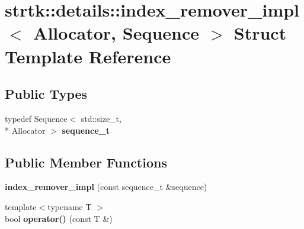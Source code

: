 \hypertarget{structstrtk_1_1details_1_1index__remover__impl}{\section{strtk\-:\-:details\-:\-:index\-\_\-remover\-\_\-impl$<$ Allocator, Sequence $>$ Struct Template Reference}
\label{structstrtk_1_1details_1_1index__remover__impl}
}
\subsection*{Public Types}
\begin{DoxyCompactItemize}
\item 
\hypertarget{structstrtk_1_1details_1_1index__remover__impl_a952e099a3c83973d0b833388c38393b4}{typedef Sequence$<$ std\-::size\-\_\-t, \\*
Allocator $>$ {\bfseries sequence\-\_\-t}}\label{structstrtk_1_1details_1_1index__remover__impl_a952e099a3c83973d0b833388c38393b4}

\end{DoxyCompactItemize}
\subsection*{Public Member Functions}
\begin{DoxyCompactItemize}
\item 
\hypertarget{structstrtk_1_1details_1_1index__remover__impl_ae2b9113e05294c44c46368b22dbab16d}{{\bfseries index\-\_\-remover\-\_\-impl} (const sequence\-\_\-t \&sequence)}\label{structstrtk_1_1details_1_1index__remover__impl_ae2b9113e05294c44c46368b22dbab16d}

\item 
\hypertarget{structstrtk_1_1details_1_1index__remover__impl_a1554308b4850444ffcf70c74ba5ad626}{{\footnotesize template$<$typename T $>$ }\\bool {\bfseries operator()} (const T \&)}\label{structstrtk_1_1details_1_1index__remover__impl_a1554308b4850444ffcf70c74ba5ad626}

\end{DoxyCompactItemize}
